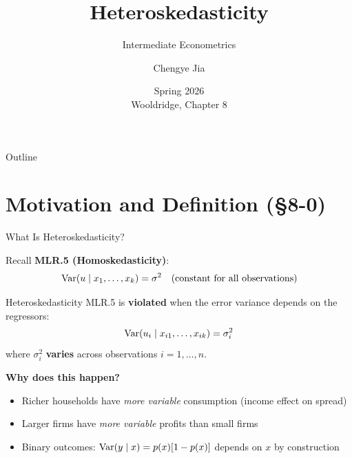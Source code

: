\documentclass[aspectratio=169, 12pt]{beamer}
\title[L7: Heteroskedasticity]{Heteroskedasticity}
\subtitle{Intermediate Econometrics}
\author[SUFE Econometrics]{Chengye Jia}
\institute{%
  Department of Economics \\
  Shandong University of Finance and Economics}
\date{Spring 2026 \\ \smallskip \scriptsize Wooldridge, Chapter 8}
\begin{document}

\begin{frame}[plain]
  \titlepage
\end{frame}

\begin{frame}[shrink=10]{Outline}
  \tableofcontents
\end{frame}

\section{Motivation and Definition (\S8-0)}

\begin{frame}{What Is Heteroskedasticity?}

  Recall \textbf{MLR.5 (Homoskedasticity)}:
  \[
    \operatorname{Var}(u \mid x_1, \ldots, x_k) = \sigma^2 \quad \text{(constant for all observations)}
  \]

  \smallskip

  \begin{definitionbox}{Heteroskedasticity}
    MLR.5 is \textbf{violated} when the error variance depends on the regressors:
    \[
      \operatorname{Var}(u_i \mid x_{i1}, \ldots, x_{ik}) = \sigma_i^2
    \]
    where $\sigma_i^2$ \textbf{varies} across observations $i = 1, \ldots, n$.
  \end{definitionbox}

  \smallskip

  \begin{keybox}
    \textbf{Why does this happen?}
    \begin{itemize}
      \item Richer households have \textit{more variable} consumption (income effect on spread)
      \item Larger firms have \textit{more variable} profits than small firms
      \item Binary outcomes: $\operatorname{Var}(y \mid x) = p(x)[1-p(x)]$ depends on $x$ by construction
    \end{itemize}
  \end{keybox}

\end{frame}
\end{document}
